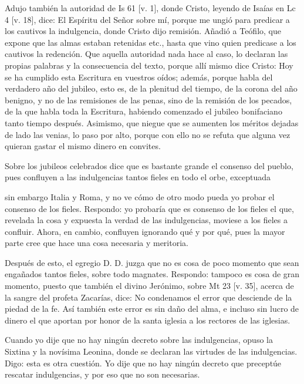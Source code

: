 Adujo también la autoridad de Is 61 [v. 1], donde Cristo, leyendo de Isaías en Lc 4 [v. 18], dice: El Espíritu del Señor sobre mí, porque me ungió para predicar a los cautivos la indulgencia, donde Cristo dijo remisión. Añadió a Teófilo, que expone que las almas estaban retenidas etc., hasta que vino quien predicase a los cautivos la redención. Que aquella autoridad nada hace al caso, lo declaran las propias palabras y la consecuencia del texto, porque allí mismo dice Cristo: Hoy se ha cumplido esta Escritura en vuestros oídos; además, porque habla del verdadero año del jubileo, esto es, de la plenitud del tiempo, de la corona del año benigno, y no de las remisiones de las penas, sino de la remisión de los pecados, de la que habla toda la Escritura, habiendo comenzado el jubileo bonifaciano tanto tiempo después. Asimismo, que niegue que se aumenten los méritos dejadas de lado las venias, lo paso por alto, porque con ello no se refuta que alguna vez quieran gastar el mismo dinero en convites.

Sobre los jubileos celebrados dice que es bastante grande el consenso del pueblo, pues confluyen a las indulgencias tantos fieles en todo el orbe, exceptuada

sin embargo Italia y Roma, y no ve cómo de otro modo pueda yo probar el consenso de los fieles. Respondo: yo probaría que es consenso de los fieles el que, revelada la cosa y expuesta la verdad de las indulgencias, moviese a los fieles a confluir. Ahora, en cambio, confluyen ignorando qué y por qué, pues la mayor parte cree que hace una cosa necesaria y meritoria.

Después de esto, el egregio D. D. juzga que no es cosa de poco momento que sean engañados tantos fieles, sobre todo magnates. Respondo: tampoco es cosa de gran momento, puesto que también el divino Jerónimo, sobre Mt 23 [v. 35], acerca de la sangre del profeta Zacarías, dice: No condenamos el error que desciende de la piedad de la fe. Así también este error es sin daño del alma, e incluso sin lucro de dinero el que aportan por honor de la santa iglesia a los rectores de las iglesias.

Cuando yo dije que no hay ningún decreto sobre las indulgencias, opuso la Sixtina y la novísima Leonina, donde se declaran las virtudes de las indulgencias. Digo: esta es otra cuestión. Yo dije que no hay ningún decreto que preceptúe rescatar indulgencias, y por eso que no son necesarias.

